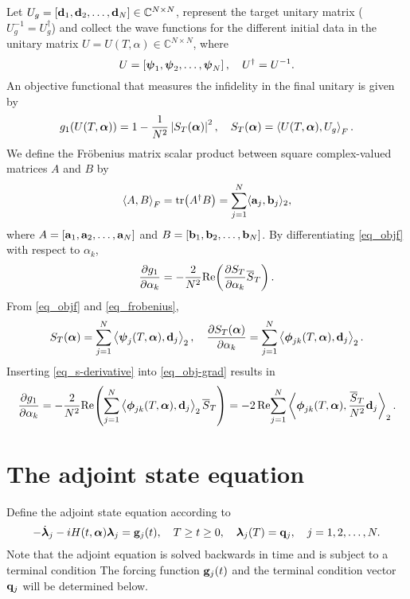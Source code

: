 \documentclass[11pt]{article}
\begin{document}
Let $U_g = [{\mathbf d}_1, {\mathbf d}_2, \ldots, {\mathbf d}_N]\in \mathbb{C}^{N\times N}$, represent the target unitary
matrix ($U_g^{-1} = U_g^\dag$) and collect the wave functions for the different initial data in the
unitary matrix $U = U(T,\alpha) \in \mathbb C^{N\times N}$, where
\begin{equation}\label{eq_u-def}
U = \left[ \boldsymbol{\psi}_1, \boldsymbol{\psi}_2, \ldots, \boldsymbol{\psi}_N \right],\quad U^\dag = U^{-1}.
\end{equation}
An objective functional that measures the infidelity in the final unitary is given by
\begin{equation}\label{eq_objf}
g_1(U(T,\boldsymbol{\alpha})) = 1 - \frac{1}{N^2} \left| S_T(\boldsymbol{\alpha}) \right|^2,\quad S_T(\boldsymbol{\alpha}) = \left\langle U(T,\boldsymbol{\alpha}), U_g \right\rangle_F.
\end{equation}
We define the Fr\"obenius matrix scalar product between square complex-valued matrices $A$ and $B$ by
\begin{equation}\label{eq_frobenius}
\left\langle A, B\right\rangle_F = \mbox{tr$\left( A^\dag B\right)$} = \sum_{j=1}^N \langle {\mathbf a}_j, {\mathbf b}_j\rangle_2,
\end{equation}
where $A=[{\mathbf a}_1, {\mathbf a}_2, \ldots, {\mathbf a}_N]$ and  $B=[{\mathbf b}_1, {\mathbf b}_2, \ldots, {\mathbf b}_N]$. By differentiating
\eqref{eq_objf} with respect to $\alpha_k$,
\begin{equation}\label{eq_obj-grad}
\frac{\partial g_1}{\partial \alpha_k} = - \frac{2}{N^2} {\rm Re}\! \left(\frac{\partial S_T}{\partial \alpha_k} \overline{S}_T \right).
\end{equation}
From \eqref{eq_objf} and \eqref{eq_frobenius},
\begin{equation} \label{eq_s-derivative}
  S_T(\boldsymbol{\alpha}) = \sum_{j=1}^N \left\langle \boldsymbol{\psi}_j(T,\boldsymbol{\alpha}), {\mathbf d}_j \right\rangle_2,\quad
  \frac{\partial S_T(\boldsymbol{\alpha})}{\partial \alpha_k} = \sum_{j=1}^N \left\langle \boldsymbol{\phi}_{jk}(T,\boldsymbol{\alpha}), {\mathbf d}_j \right\rangle_2.
\end{equation}
Inserting \eqref{eq_s-derivative} into \eqref{eq_obj-grad} results in
\begin{equation}\label{eq_obj-grad-exp}
  \frac{\partial g_1}{\partial \alpha_k} = - \frac{2}{N^2} {\rm Re}\! \left(\sum_{j=1}^N \left\langle
  \boldsymbol{\phi}_{jk}(T,\boldsymbol{\alpha}), {\mathbf d}_j \right\rangle_2 \overline{S}_T \right)
  = - 2\, {\rm Re}\! \sum_{j=1}^N \left\langle \boldsymbol{\phi}_{jk}(T,\boldsymbol{\alpha}), \frac{\overline{S}_T}{N^2} {\mathbf d}_j \right\rangle_2.  
\end{equation}

\section{The adjoint state equation}
Define the adjoint state equation according to
\begin{equation}\label{eq_adjoint}
-\dot{\boldsymbol{\lambda}}_j - iH(t,\boldsymbol{\alpha})\boldsymbol{\lambda}_j={\mathbf g}_j(t),\quad T\geq t\geq 0, \quad \boldsymbol{\lambda}_j(T)={\mathbf q}_j,\quad j=1,2,\ldots,N.
\end{equation}
Note that the adjoint equation is solved backwards in time and is subject to a terminal condition
The forcing function ${\mathbf g}_j(t)$ and the terminal condition vector ${\mathbf q}_j$ will be determined below.
\end{document}

